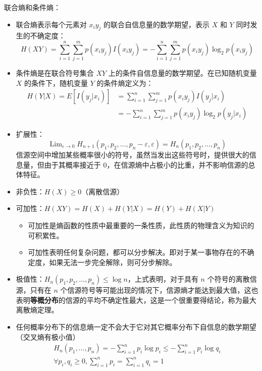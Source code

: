 \begin{remark}
    联合熵和条件熵：
    \begin{itemize}
        \item 联合熵表示每个元素对 $x_iy_j$ 的联合自信息量的数学期望，表示 $X$ 和 $Y$ 同时发生的不确定度：\[H(XY) = \sum_{i = 1}^n\sum_{j = 1}^m p(x_iy_j)I(x_iy_j) = -\sum_{i = 1}^n\sum_{j = 1}^m p(x_iy_j)\log_2 p(x_iy_j)\]
        \item 条件熵是在联合符号集合 $XY$ 上的条件自信息量的数学期望。在已知随机变量 $X$ 的条件下，随机变量 $Y$ 的条件熵定义为：\begin{align*}
            H(Y | X) = E[I(y_j | x_i)] &= \sum_{i = 1}^n\sum_{j = 1}^m p(x_iy_j)I(y_j | x_i)\\
            &= -\sum_{i = 1}^n\sum_{j = 1}^m p(x_iy_j) \log_2 p(y_j | x_i)
        \end{align*}
        \item 扩展性：\[\operatorname{Lim}_{\varepsilon \rightarrow 0} H_{n+1}\left(p_{1}, p_{2}, \ldots, p_{n}-\varepsilon, \varepsilon\right)=H_{n}\left(p_{1}, p_{2}, \ldots, p_{n}\right)\]
        信源空间中增加某些概率很小的符号，虽然当发出这些符号时，提供很大的信息量，但由于其概率接近于 0，在信源熵中占极小的比重，并不影响信源的总体特征。
        \item 非负性：$H(X)\ge 0$（离散信源）
        \item 可加性：$H(XY) = H(X) + H(Y | X) = H(Y) + H(X | Y)$
            \begin{itemize}
                \item 可加性是熵函数的性质中最重要的一条性质，此性质的物理含义为知识的可积累性。
                \item 可加性表明任何复杂问题，都可以分步解决。即对于某一事物存在的不确定度，如果无法一步完全解除，则可分步解除。
            \end{itemize}
        \item 极值性：$H_{n}(p_{1}, p_{2}, \dots, p_{n}) \leq \log n$，上式表明，对于具有 $n$ 个符号的离散信源，只有在 $n$ 个信源符号等可能出现的情况下，信源熵才能达到最大值，这也表明\textbf{等概分布}的信源的平均不确定性最大，这是一个很重要得结论，称为最大离散熵定理。
        \item 任何概率分布下的信息熵一定不会大于它对其它概率分布下自信息的数学期望（交叉熵有极小值）\begin{gather*}
            H_n(p_1, \dots, p_n) = -\sum_{i = 1}^n p_i\log p_i \le -\sum_{i = 1}^n p_i\log q_i \\
            \forall p_i, q_i \ge 0, \sum_{i = 1}^n p_i = \sum_{i = 1}^n q_i = 1

\end{gather*}
\end{itemize}
\end{remark}
